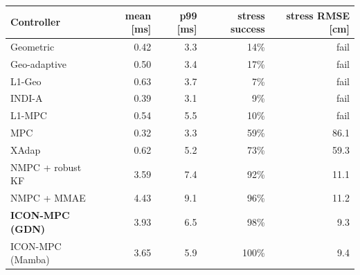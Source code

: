 \begin{tabular}{l r r r r}
\toprule
Controller & mean [ms] & p99 [ms] & stress success & stress RMSE [cm] \\
\midrule
Geometric & 0.42 & 3.3 & 14\% & fail \\
Geo-adaptive & 0.50 & 3.4 & 17\% & fail \\
L1-Geo & 0.63 & 3.7 & 7\% & fail \\
INDI-A & 0.39 & 3.1 & 9\% & fail \\
L1-MPC & 0.54 & 5.5 & 10\% & fail \\
MPC & 0.32 & 3.3 & 59\% & 86.1 \\
XAdap & 0.62 & 5.2 & 73\% & 59.3 \\
\midrule
NMPC + robust KF & 3.59 & 7.4 & 92\% & 11.1 \\
NMPC + MMAE & 4.43 & 9.1 & 96\% & 11.2 \\
\textbf{ICON-MPC (GDN)} & 3.93 & 6.5 & 98\% & 9.3 \\
ICON-MPC (Mamba) & 3.65 & 5.9 & 100\% & 9.4 \\
\bottomrule
\end{tabular}

